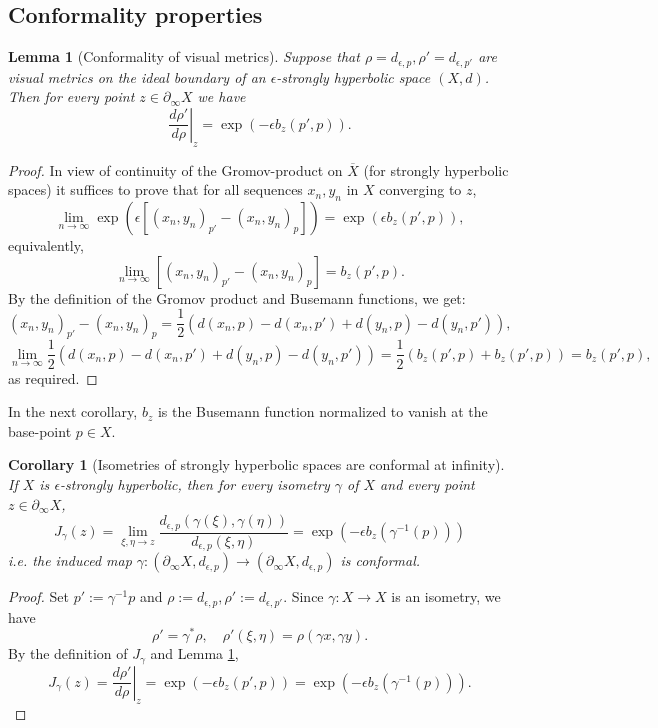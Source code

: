 \documentclass[12pt]{amsbook}%
\newtheorem{lem}[thm]{Lemma}
\newtheorem{cor}[thm]{Corollary}
\theoremstyle{definition}
\theoremstyle{remark}
\numberwithin{section}{chapter}
\numberwithin{subsection}{section}
\numberwithin{figure}{chapter}
\def\eps{\epsilon}
\def\ga{\gamma}
\def\geo{\partial_\infty}
\def\ol{\overline}
\begin{document}
\subsection{Conformality properties} \label{sec:Conformality properties}


\begin{lem}
[Conformality of visual metrics] \label{lem:conformality of visual metrics}
Suppose that $\rho=d_{\eps,p}, \rho'=d_{\eps,p'}$ are visual metrics on the ideal boundary of an 
$\eps$-strongly hyperbolic space $(X,d)$. Then for every point $z\in \geo X$ we have
$$
\left. \frac{d\rho'}{d\rho}\right\vert_z=\exp(-\eps b_z(p',p)). 
$$
\end{lem}
\begin{proof} In view of continuity of the Gromov-product on $\ol{X}$ (for strongly hyperbolic spaces) it 
suffices to prove that for all sequences $x_n, y_n$ in $X$ converging to $z$,
$$
\lim_{n\to\infty} \exp(\eps [(x_n,y_n)_{p'} - (x_n, y_n)_{p}])=  \exp(\eps b_z(p',p)), 
$$ 
equivalently,
$$
\lim_{n\to\infty} [(x_n,y_n)_{p'} - (x_n, y_n)_{p}]= b_z(p',p).
$$
By the definition of the Gromov product and Busemann functions, we get:
$$
(x_n,y_n)_{p'} - (x_n, y_n)_{p}= \frac{1}{2}\left(d(x_n,p)- d(x_n,p')+ d(y_n,p)- d(y_n,p')\right), 
$$
$$
\lim_{n\to\infty} \frac{1}{2}\left(d(x_n,p)- d(x_n,p')+ d(y_n,p)- d(y_n,p')\right)= \frac{1}{2}\left(b_z(p',p) + b_z(p',p)\right)= b_z(p',p),
$$
as required. 
\end{proof}

In the next corollary, $b_z$ is the Busemann function normalized to vanish at the base-point $p\in X$. 

\begin{cor}
[Isometries of strongly hyperbolic spaces are conformal at infinity] 
\label{cor:conformality of visual metrics}
If $X$ is $\eps$-strongly hyperbolic, then for every isometry $\ga$ of $X$ and every point $z\in \geo X$,  
$$
J_\ga(z)=\lim_{\xi, \eta\to z} \frac{d_{\eps,p}(\ga(\xi), \ga(\eta))}{d_{\eps,p}(\xi,\eta)}=  
\exp(-\eps b_z(\ga^{-1}(p)))%
$$
i.e. the induced map $\ga: (\geo X, d_{\eps,p})\to (\geo X, d_{\eps,p})$ is conformal. 
\end{cor}
\begin{proof}  Set $p':= \ga^{-1} p$ and $\rho:= d_{\eps,p}, \rho':= d_{\eps,p'}$. Since $\ga: X\to X$ is an isometry, we have 
$$
\rho'= \ga^*\rho, \quad \rho'(\xi,\eta)= \rho(\ga x, \ga y).  
$$
By the definition of $J_\ga$ and Lemma \ref{lem:conformality of visual metrics}, 
$$
J_\ga(z)=\left. \frac{d\rho'}{d\rho}\right\vert_z= \exp(-\eps b_z(p',p))=  \exp(-\eps b_z(\ga^{-1}(p))). 
$$
\end{proof}
\end{document}

